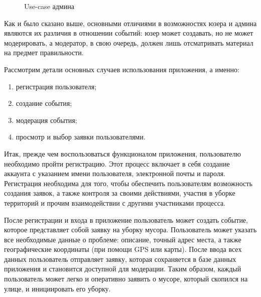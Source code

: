 \documentclass[diploma]{SCWorks}
\begin{document}
\begin{figure}[H]
	\caption{Use-case админа}
	\label{pic:use-case_admin}
\end{figure}

Как и было сказано выше, основными отличиями в возможностях юзера и админа 
являются их различия в отношении событий: юзер может создавать, но не может 
модерировать, а модератор, в свою очередь, должен лишь отсматривать материал
на предмет правильности.

Рассмотрим детали основных случаев использования приложения, а именно:
\begin{enumerate}
    \item регистрация пользователя;
    \item создание события;
    \item модерация события;
    \item просмотр и выбор заявки пользователями.
\end{enumerate}

Итак, прежде чем воспользоваться функционалом приложения, пользователю необходимо 
пройти регистрацию. Этот процесс включает в себя создание аккаунта с указанием 
имени пользователя, электронной почты и пароля. Регистрация необходима для того, чтобы обеспечить пользователям возможность 
создания заявок, а также контроля за своими действиями, участия в уборке 
территорий и прочим взаимодействии с другими участниками процесса.

После регистрации и входа в приложение пользователь может создать событие, 
которое представляет собой заявку на уборку мусора. Пользователь может 
указать все необходимые данные о проблеме: описание, точный адрес 
места, а также географические координаты (при помощи GPS или карты). 
После ввода всех данных пользователь отправляет заявку, которая сохраняется 
в базе данных приложения и становится доступной для модерации. Таким образом, 
каждый пользователь может легко и оперативно заявить о мусоре, который 
скопился на улице, и инициировать его уборку. 
\end{document}
